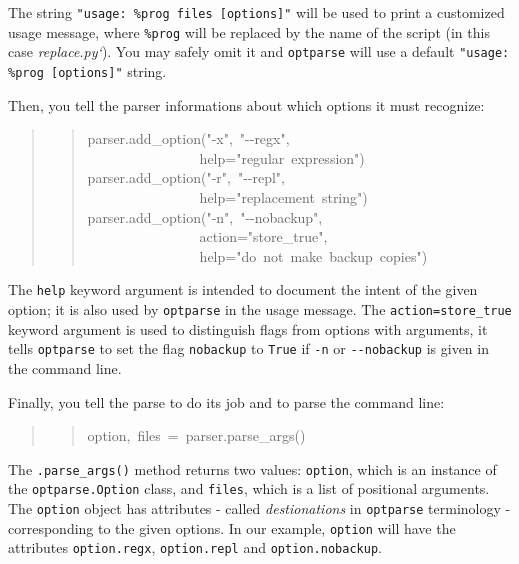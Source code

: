 \documentclass[10pt,a4paper,english]{article}
\newcommand{\titlereference}[1]{\textsl{#1}}
\begin{document}
The string \texttt{"usage: {\%}prog files {[}options]"} will be used to
print a customized usage message,  where \texttt{{\%}prog} will be replaced
by the name of the script (in this case \titlereference{replace.py`}). You
may safely omit it and \texttt{optparse} will use a default 
\texttt{"usage: {\%}prog {[}options]"} string.

Then, you tell the parser informations about which options
it must recognize:
\begin{quote}
\begin{quote}{\ttfamily \raggedright \noindent
parser.add{\_}option("-x",~"-{}-regx",~\\
~~~~~~~~~~~~~~~~help="regular~expression")~\\
parser.add{\_}option("-r",~"-{}-repl",~\\
~~~~~~~~~~~~~~~~help="replacement~string")~\\
parser.add{\_}option("-n",~"-{}-nobackup",~\\
~~~~~~~~~~~~~~~~action="store{\_}true",~\\
~~~~~~~~~~~~~~~~help="do~not~make~backup~copies")
}\end{quote}
\end{quote}

The \texttt{help} keyword argument is intended to document the
intent of the given option; it is also used by \texttt{optparse} in the 
usage message. The \texttt{action=store{\_}true} keyword argument is
used to distinguish flags from options with arguments, it tells
\texttt{optparse} to set the flag \texttt{nobackup} to \texttt{True} if \texttt{-n}
or \texttt{-{}-nobackup} is given in the command line.

Finally, you tell the parse to do its job and to parse the command line:
\begin{quote}
\begin{quote}{\ttfamily \raggedright \noindent
option,~files~=~parser.parse{\_}args()
}\end{quote}
\end{quote}

The \texttt{.parse{\_}args()} method returns two values: \texttt{option}, 
which is an instance of the \texttt{optparse.Option} class, and \texttt{files},
which is a list of positional arguments.
The \texttt{option} object has attributes - called \emph{destionations} in 
\texttt{optparse} terminology - corresponding to the given options.
In our example, \texttt{option} will have the attributes \texttt{option.regx}, 
\texttt{option.repl} and  \texttt{option.nobackup}.
\end{document}

